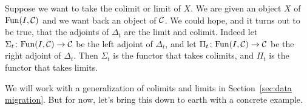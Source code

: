 \documentclass[CT4S-EN-RU]{subfiles}
\begin{document}
\begin{blockRUS}
\end{blockRUS}

\begin{blockENG}
Suppose we want to take the colimit or limit of $X$. We are given an object $X$ of $\textnormal{Fun}(I,\mathcal{C})$ and we want back an object of $\mathcal{C}$. We could hope, and it turns out to be true, that the adjoints of $\Delta_t$ are the limit and colimit. Indeed let $\Sigma_t\colon\textnormal{Fun}(I,\mathcal{C})\rightarrow\mathcal{C}$ be the left adjoint of $\Delta_t$, and let $\Pi_t\colon\textnormal{Fun}(I,\mathcal{C})\rightarrow\mathcal{C}$ be the right adjoint of $\Delta_t$. Then $\Sigma_t$ is the functor that takes colimits, and $\Pi_t$ is the functor that takes limits.
\end{blockENG}

\begin{blockRUS}
\end{blockRUS}

\begin{blockENG}
We will work with a generalization of colimits and limits in Section~\ref{sec:data migration}. But for now, let's bring this down to earth with a concrete example.
\end{blockENG}

\begin{blockRUS}
\end{blockRUS}
\end{document}
